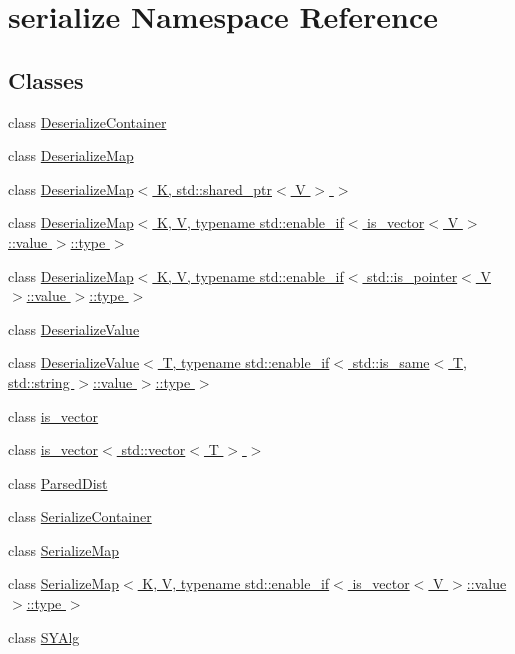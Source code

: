 \hypertarget{namespaceserialize}{}\section{serialize Namespace Reference}
\label{namespaceserialize}
\subsection*{Classes}
\begin{DoxyCompactItemize}
\item 
class \hyperlink{classserialize_1_1_deserialize_container}{Deserialize\+Container}
\item 
class \hyperlink{classserialize_1_1_deserialize_map}{Deserialize\+Map}
\item 
class \hyperlink{classserialize_1_1_deserialize_map_3_01_k_00_01std_1_1shared__ptr_3_01_v_01_4_01_4}{Deserialize\+Map$<$ K, std\+::shared\+\_\+ptr$<$ V $>$ $>$}
\item 
class \hyperlink{classserialize_1_1_deserialize_map_3_01_k_00_01_v_00_01typename_01std_1_1enable__if_3_01is__vected2d1ee1f8886a5a92a6dbc69e18bdcd}{Deserialize\+Map$<$ K, V, typename std\+::enable\+\_\+if$<$ is\+\_\+vector$<$ V $>$\+::value $>$\+::type $>$}
\item 
class \hyperlink{classserialize_1_1_deserialize_map_3_01_k_00_01_v_00_01typename_01std_1_1enable__if_3_01std_1_1ibe6cfa8a2d341f3a0942baedd95196d5}{Deserialize\+Map$<$ K, V, typename std\+::enable\+\_\+if$<$ std\+::is\+\_\+pointer$<$ V $>$\+::value $>$\+::type $>$}
\item 
class \hyperlink{classserialize_1_1_deserialize_value}{Deserialize\+Value}
\item 
class \hyperlink{classserialize_1_1_deserialize_value_3_01_t_00_01typename_01std_1_1enable__if_3_01std_1_1is__sambc4bb2b40dcc8b30285e8bdc35bf8b03}{Deserialize\+Value$<$ T, typename std\+::enable\+\_\+if$<$ std\+::is\+\_\+same$<$ T, std\+::string $>$\+::value $>$\+::type $>$}
\item 
class \hyperlink{classserialize_1_1is__vector}{is\+\_\+vector}
\item 
class \hyperlink{classserialize_1_1is__vector_3_01std_1_1vector_3_01_t_01_4_01_4}{is\+\_\+vector$<$ std\+::vector$<$ T $>$ $>$}
\item 
class \hyperlink{classserialize_1_1_parsed_dist}{Parsed\+Dist}
\item 
class \hyperlink{classserialize_1_1_serialize_container}{Serialize\+Container}
\item 
class \hyperlink{classserialize_1_1_serialize_map}{Serialize\+Map}
\item 
class \hyperlink{classserialize_1_1_serialize_map_3_01_k_00_01_v_00_01typename_01std_1_1enable__if_3_01is__vector3a4a5c31f236854fe1872e17684001d1}{Serialize\+Map$<$ K, V, typename std\+::enable\+\_\+if$<$ is\+\_\+vector$<$ V $>$\+::value $>$\+::type $>$}
\item 
class \hyperlink{classserialize_1_1_s_y_alg}{S\+Y\+Alg}
\end{DoxyCompactItemize}
